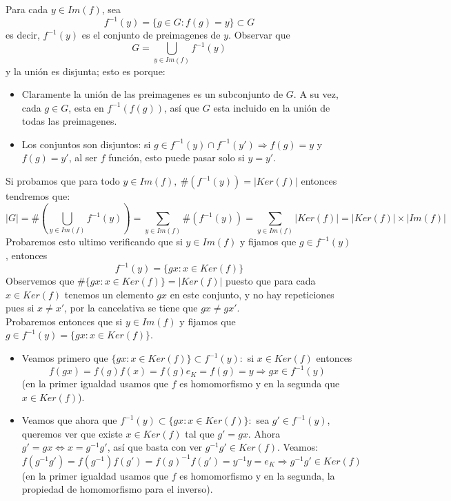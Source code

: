 \documentclass{report}
\begin{document}
\begin{myproof}
    Para cada $y\in Im(f)$, sea$$f^{-1}(y)=\{g\in G:f(g)=y\}\subset G$$es decir, $f^{-1}(y)$ es el conjunto de preimagenes de $y$. Observar que$$G=\bigcup _{y\in Im( f)} f^{-1}( y)$$y la unión es disjunta; esto es porque:
    \begin{itemize}
        \item Claramente la unión de las preimagenes es un subconjunto de $G$. A su vez, cada $g\in G$, esta en $f^{-1}(f(g))$, así que $G$ esta incluido en la unión de todas las preimagenes.
        \item Los conjuntos son disjuntos: si $g\in f^{-1}(y)\cap f^{-1}(y')\Rightarrow f(g)=y$ y $f(g)=y'$, al ser $f$ función, esto puede pasar solo si $y=y'$.
    \end{itemize}
    Si probamos que para todo $y\in Im(f),\ \#(f^{-1}(y))=|Ker(f)|$ entonces tendremos que:$$|G|=\#\left(\bigcup _{y\in Im( f)} f^{-1}( y)\right) =\sum _{y\in Im( f)} \#\left( f^{-1}( y)\right) =\sum _{y\in Im( f)} |Ker( f) |=|Ker( f) |\times |Im( f) |$$Probaremos esto ultimo verificando que si $y\in Im(f)$ y fijamos que $g\in f^{-1}(y)$, entonces$$f^{-1}(y)=\{gx:x\in Ker(f)\}$$Observemos que $\#\{gx:x\in Ker(f)\}=|Ker(f)|$ puesto que para cada $x\in Ker(f)$ tenemos un elemento $gx$ en este conjunto, y no hay repeticiones pues si $x\neq x'$, por la cancelativa se tiene que $gx\neq gx'$.\\Probaremos entonces que si $y\in Im(f)$ y fijamos que $g\in f^{-1}(y)=\{gx:x\in Ker(f)\}$.
    \begin{itemize}
        \item Veamos primero que $\{gx:x\in Ker(f)\}\subset f^{-1}(y):$ si $x\in Ker(f)$ entonces$$f(gx)=f(g)f(x)=f(g)e_K=f(g)=y\Rightarrow gx\in f^{-1}(y)$$(en la primer igualdad usamos que $f$ es homomorfismo y en la segunda que $x\in Ker(f)$).
        \item Veamos que ahora que $f^{-1}(y)\subset\{gx:x\in Ker(f)\}:$ sea $g'\in f^{-1}(y)$, queremos ver que existe $x\in Ker(f)$ tal que $g'=gx$. Ahora $g'=gx\Leftrightarrow x=g^{-1}g'$, así que basta con ver $g^{-1}g'\in Ker(f)$. Veamos:$$f(g^{-1}g')=f(g^{-1})f(g')=f(g)^{-1}f(g')=y^{-1}y=e_K\Rightarrow g^{-1}g'\in Ker(f)$$(en la primer igualdad usamos que $f$ es homomorfismo y en la segunda, la propiedad de homomorfismo para el inverso).
    \end{itemize}
\end{myproof}
\end{document}
